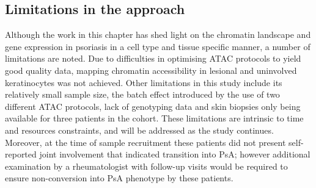 \subsection{Limitations in the approach}
Although the work in this chapter has shed light on the chromatin landscape and gene expression in psoriasis in a cell type and tissue specific manner, a number of limitations are noted.  Due to difficulties in optimising ATAC protocols to yield good quality data, mapping chromatin accessibility in lesional and uninvolved keratinocytes was not achieved. %
Other limitations in this study include its relatively small sample size, the batch effect introduced by the use of two different ATAC protocols, lack of genotyping data and skin biopsies only being available for three patients in the cohort. These limitations are intrinsic to time and resources constraints, and will be addressed as the study continues. Moreover, at the time of sample recruitment these patients did not present self-reported joint involvement that indicated transition into PsA; however additional examination by a rheumatologist with follow-up visits would be required to ensure non-conversion into PsA phenotype by these patients. %

